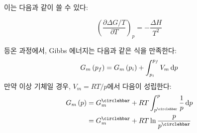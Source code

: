         이는 다음과 같이 쓸 수 있다:
        \begin{cor}
        \begin{equation*}
            \left(\frac{\partial \Delta G/T}{\partial T}\right)_p = -\frac{\Delta H}{T^2}
        \end{equation*}
        \end{cor}
        \par 등온 과정에서, Gibbs 에너지는 다음과 같은 식을 만족한다:
        \begin{equation*}
            G_m\left(p_f\right) = G_m\left(p_i\right)+\int_{p_i}^{p_f}V_m \operatorname{d\!} p
        \end{equation*}
        만약 이상 기체일 경우, $V_m = RT/p$에서 다음이 성립한다:
        \begin{equation*}
            \begin{aligned}
                G_m\left(p\right) &= G_m^{\circlehbar} + RT \int_{p^\circlehbar}^{p}\frac{1}{p}\difform p\\
                &= G_m^\circlehbar + RT \ln{\frac{p}{p^\circlehbar}}
            \end{aligned}
        \end{equation*}